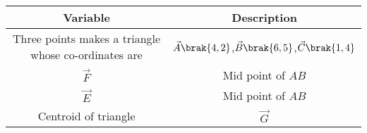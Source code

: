 \begin{tabular}[12pt]{ |c| c|}
    \hline
    \textbf{Variable} & \textbf{Description}\\ 
    \hline
    Three points makes a triangle whose co-ordinates are & $\vec{A}\brak{4,2}$,$\vec{B}\brak{6,5}$,$\vec{C}\brak{1,4}$ \\
    \hline
    $\vec{F}$ &  Mid point of $AB$ \\
    \hline 
    $\vec{E}$ &  Mid point of $AB$ \\
    \hline   
    Centroid of triangle & $\vec{G}$\\
    \hline
    \end{tabular}
